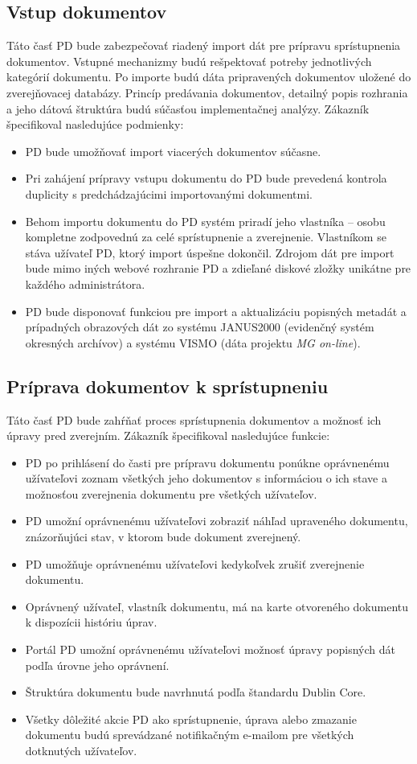 \documentclass[
  print, %
  table,   %
  lof,     %
  nolot,     %
]{fithesis3}
\begin{document}
\subsection{Vstup dokumentov} 
Táto časť PD bude zabezpečovať riadený import dát pre prípravu sprístupnenia dokumentov. Vstupné mechanizmy budú rešpektovať potreby jednotlivých kategórií dokumentu. Po importe budú dáta pripravených dokumentov uložené do zverejňovacej databázy. Princíp predávania dokumentov, detailný popis rozhrania a jeho dátová štruktúra budú súčasťou implementačnej analýzy. Zákazník špecifikoval nasledujúce podmienky:
\begin{itemize}
	\item PD bude umožňovať import viacerých dokumentov súčasne.
	\item Pri zahájení prípravy vstupu dokumentu do PD bude prevedená kontrola duplicity s predchádzajúcimi importovanými dokumentmi.
	\item Behom importu dokumentu do PD systém priradí jeho vlastníka – osobu kompletne zodpovednú za celé sprístupnenie a zverejnenie. Vlastníkom se stáva užívateľ PD, ktorý import úspešne dokončil. Zdrojom dát pre import bude mimo iných webové rozhranie PD a zdieľané diskové zložky unikátne pre každého administrátora.
	\item PD bude disponovať funkciou pre import a aktualizáciu popisných metadát a prípadných obrazových dát zo systému JANUS2000 (evidenčný systém okresných archívov) a systému VISMO (dáta projektu \textit{MG on-line}).
\end{itemize}
\subsection{Príprava dokumentov k sprístupneniu}
Táto časť PD bude zahŕňať proces sprístupnenia dokumentov a možnosť ich úpravy pred zverejním. Zákazník špecifikoval nasledujúce funkcie:
\begin{itemize}
	\item PD po prihlásení do časti pre prípravu dokumentu ponúkne oprávnenému užívateľovi zoznam všetkých jeho dokumentov s informáciou o ich stave a možnosťou zverejnenia dokumentu pre všetkých užívateľov.
	\item PD umožní oprávnenému užívateľovi zobraziť náhľad upraveného dokumentu, znázorňujúci stav, v ktorom bude dokument zverejnený.
	\item PD umožňuje oprávnenému užívateľovi kedykoľvek zrušiť zverejnenie dokumentu. 
	\item Oprávnený užívateľ, vlastník dokumentu, má na karte otvoreného dokumentu k dispozícii históriu úprav.
	\item Portál PD umožní oprávnenému užívateľovi možnosť úpravy popisných dát podľa úrovne jeho oprávnení.
	\item Štruktúra dokumentu bude navrhnutá podľa štandardu Dublin Core.
	\item Všetky dôležité akcie PD ako sprístupnenie, úprava alebo zmazanie dokumentu budú sprevádzané notifikačným e-mailom pre všetkých dotknutých užívateľov.
\end{itemize}
\end{document}
